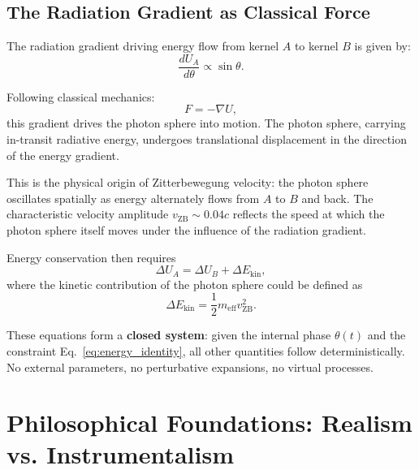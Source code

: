 \documentclass[12pt,letterpaper]{article}
\begin{document}
\subsection{The Radiation Gradient as Classical Force}

The radiation gradient driving energy flow from kernel $A$ to kernel $B$ is given by:
\begin{equation}
\frac{dU_A}{d\theta} \propto \sin\theta.
\end{equation}

Following classical mechanics:
\begin{equation}
F = -\nabla U,
\end{equation}
this gradient drives the photon sphere into motion. The photon sphere, carrying in-transit radiative energy, undergoes translational displacement in the direction of the energy gradient.

This is the physical origin of Zitterbewegung velocity: the photon sphere oscillates spatially as energy alternately flows from $A$ to $B$ and back. The characteristic velocity amplitude $v_{\mathrm{ZB}} \sim 0.04c$ reflects the speed at which the photon sphere itself moves under the influence of the radiation gradient.

Energy conservation then requires
\begin{equation}
\Delta U_A = \Delta U_B + \Delta E_{\mathrm{kin}},
\end{equation}
where the kinetic contribution of the photon sphere could be defined as
\begin{equation}
\Delta E_{\mathrm{kin}} = \frac{1}{2} m_{\mathrm{eff}} v_{\mathrm{ZB}}^2 .
\end{equation}

These equations form a \textbf{closed system}: given the internal phase $\theta(t)$ and the constraint Eq.~\eqref{eq:energy_identity}, all other quantities follow deterministically. No external parameters, no perturbative expansions, no virtual processes.


\section{Philosophical Foundations: Realism vs. Instrumentalism}
\label{sec:philosophical}
\end{document}
